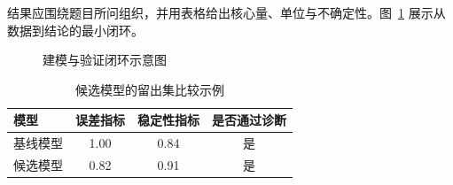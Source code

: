 结果应围绕题目所问组织，并用表格给出核心量、单位与不确定性。图~\ref{fig:workflow} 展示从数据到结论的最小闭环。
\begin{figure}[htbp]
  \centering
  \caption{建模与验证闭环示意图}
  \label{fig:workflow}
\end{figure}

\begin{table}[htbp]
  \centering
  \caption{候选模型的留出集比较示例}
  \begin{tabular}{lccc}
    \toprule
    模型 & 误差指标 & 稳定性指标 & 是否通过诊断 \\
    \midrule
    基线模型 & 1.00 & 0.84 & 是 \\
    候选模型 & 0.82 & 0.91 & 是 \\
    \bottomrule
  \end{tabular}
\end{table}
